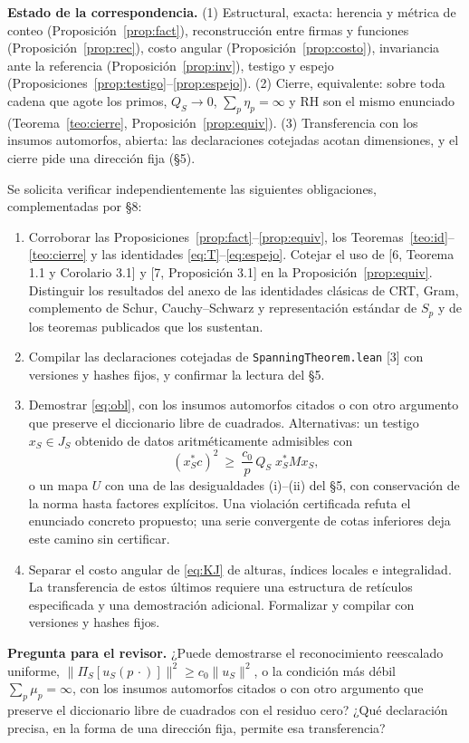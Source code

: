 \documentclass[11pt,a4paper]{article}
\theoremstyle{plain}
\begin{document}
\textbf{Estado de la correspondencia.} (1) Estructural, exacta: herencia y métrica de conteo (Proposición~\ref{prop:fact}), reconstrucción entre firmas y funciones (Proposición~\ref{prop:rec}), costo angular (Proposición~\ref{prop:costo}), invariancia ante la referencia (Proposición~\ref{prop:inv}), testigo y espejo (Proposiciones~\ref{prop:testigo}–\ref{prop:espejo}). (2) Cierre, equivalente: sobre toda cadena que agote los primos, $Q_S\to0$, $\sum_p\eta_p=\infty$ y RH son el mismo enunciado (Teorema~\ref{teo:cierre}, Proposición~\ref{prop:equiv}). (3) Transferencia con los insumos automorfos, abierta: las declaraciones cotejadas acotan dimensiones, y el cierre pide una dirección fija (§5).

Se solicita verificar independientemente las siguientes obligaciones, complementadas por §8:
\begin{enumerate}[leftmargin=2em,itemsep=3pt]
\item Corroborar las Proposiciones~\ref{prop:fact}–\ref{prop:equiv}, los Teoremas~\ref{teo:id}–\ref{teo:cierre} y las identidades \eqref{eq:T}–\eqref{eq:espejo}. Cotejar el uso de [6, Teorema 1.1 y Corolario 3.1] y [7, Proposición 3.1] en la Proposición~\ref{prop:equiv}. Distinguir los resultados del anexo de las identidades clásicas de CRT, Gram, complemento de Schur, Cauchy–Schwarz y representación estándar de $S_p$ y de los teoremas publicados que los sustentan.
\item Compilar las declaraciones cotejadas de \texttt{SpanningTheorem.lean} [3] con versiones y hashes fijos, y confirmar la lectura del §5.
\item Demostrar \eqref{eq:obl}, con los insumos automorfos citados o con otro argumento que preserve el diccionario libre de cuadrados. Alternativas: un testigo $x_S\in J_S$ obtenido de datos aritméticamente admisibles con
\[
(x_S^*c)^2\ \ge\ \frac{c_0}{p}\,Q_S\;x_S^*Mx_S ,
\]
o un mapa $U$ con una de las desigualdades (i)–(ii) del §5, con conservación de la norma hasta factores explícitos. Una violación certificada refuta el enunciado concreto propuesto; una serie convergente de cotas inferiores deja este camino sin certificar.
\item Separar el costo angular de \eqref{eq:KJ} de alturas, índices locales e integralidad. La transferencia de estos últimos requiere una estructura de retículos especificada y una demostración adicional. Formalizar y compilar con versiones y hashes fijos.
\end{enumerate}

\textbf{Pregunta para el revisor.} ¿Puede demostrarse el reconocimiento reescalado uniforme, $\|\Pi_S[u_S(p\,\cdot)]\|^2\ge c_0\|u_S\|^2$, o la condición más débil $\sum_p\mu_p=\infty$, con los insumos automorfos citados o con otro argumento que preserve el diccionario libre de cuadrados con el residuo cero? ¿Qué declaración precisa, en la forma de una dirección fija, permite esa transferencia?
\end{document}
